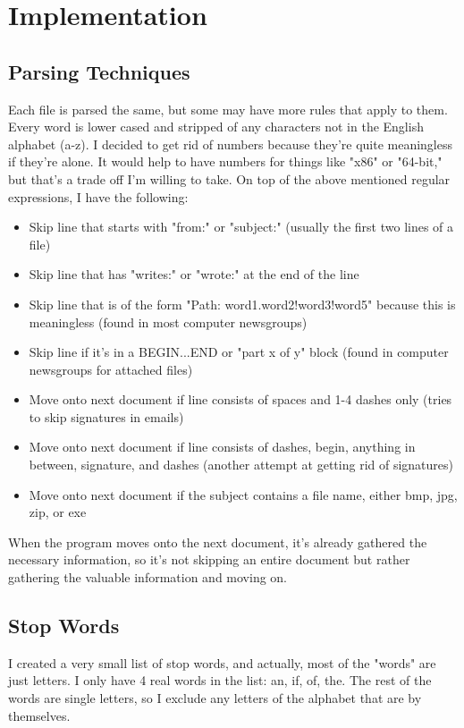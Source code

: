 \documentclass[11pt]{article}
\begin{document}
\section{Implementation}
\subsection{Parsing Techniques}
Each file is parsed the same, but some may have more rules that apply to them.  Every word is lower cased and stripped of any characters not in the English alphabet (a-z).  I decided to get rid of numbers because they're quite meaningless if they're alone.  It would help to have numbers for things like "x86" or "64-bit," but that's a trade off I'm willing to take.
\newline\newline
On top of the above mentioned regular expressions, I have the following:
\begin{itemize}
\item Skip line that starts with "from:" or "subject:" (usually the first two lines of a file)
\item Skip line that has "writes:" or "wrote:" at the end of the line
\item Skip line that is of the form "Path: word1.word2!word3!word5" because this is meaningless (found in most computer newsgroups)
\item Skip line if it's in a BEGIN...END or "part x of y" block (found in computer newsgroups for attached files)
\item Move onto next document if line consists of spaces and 1-4 dashes only (tries to skip signatures in emails)
\item Move onto next document if line consists of dashes, begin, anything in between, signature, and dashes (another attempt at getting rid of signatures)
\item Move onto next document if the subject contains a file name, either bmp, jpg, zip, or exe
\end{itemize}
When the program moves onto the next document, it's already gathered the necessary information, so it's not skipping an entire document but rather gathering the valuable information and moving on.
\subsection{Stop Words}
I created a very small list of stop words, and actually, most of the "words" are just letters.  I only have 4 real words in the list: an, if, of, the.  The rest of the words are single letters, so I exclude any letters of the alphabet that are by themselves.
\end{document}
